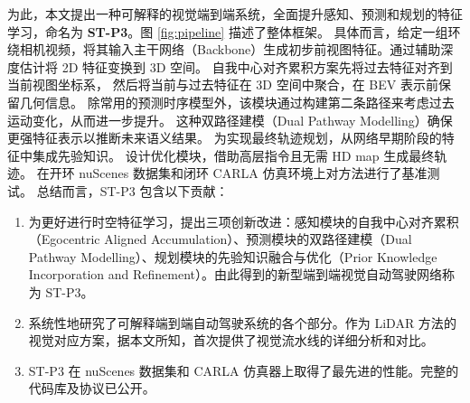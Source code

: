 \documentclass[runningheads]{llncs}
\begin{document}
为此，本文提出一种可解释的视觉端到端系统，全面提升感知、预测和规划的特征学习，命名为 \textbf{ST-P3}。图 \ref{fig:pipeline} 描述了整体框架。
%
具体而言，给定一组环绕相机视频，将其输入主干网络（Backbone）生成初步前视图特征。通过辅助深度估计将 2D 特征变换到 3D 空间。
自我中心对齐累积方案先将过去特征对齐到当前视图坐标系，
%
然后将当前与过去特征在 3D 空间中聚合，在 BEV 表示前保留几何信息。
%
除常用的预测时序模型外，该模块通过构建第二条路径来考虑过去运动变化，从而进一步提升。
%
这种双路径建模（Dual Pathway Modelling）确保更强特征表示以推断未来语义结果。
%
为实现最终轨迹规划，从网络早期阶段的特征中集成先验知识。
设计优化模块，借助高层指令且无需 HD map 生成最终轨迹。
%
在开环 nuScenes 数据集和闭环 CARLA 仿真环境上对方法进行了基准测试。
总结而言，ST-P3 包含以下贡献：
\begin{enumerate}
    \item 为更好进行时空特征学习，提出三项创新改进：感知模块的自我中心对齐累积（Egocentric Aligned Accumulation）、预测模块的双路径建模（Dual Pathway Modelling）、规划模块的先验知识融合与优化（Prior Knowledge Incorporation and Refinement）。由此得到的新型端到端视觉自动驾驶网络称为 ST-P3。
    \item 系统性地研究了可解释端到端自动驾驶系统的各个部分。作为 LiDAR 方法\cite{zeng2020dsdnet}的视觉对应方案，据本文所知，首次提供了视觉流水线的详细分析和对比。
    \item ST-P3 在 nuScenes 数据集和 CARLA 仿真器上取得了最先进的性能。完整的代码库及协议已公开。
\end{enumerate}



\end{document}
